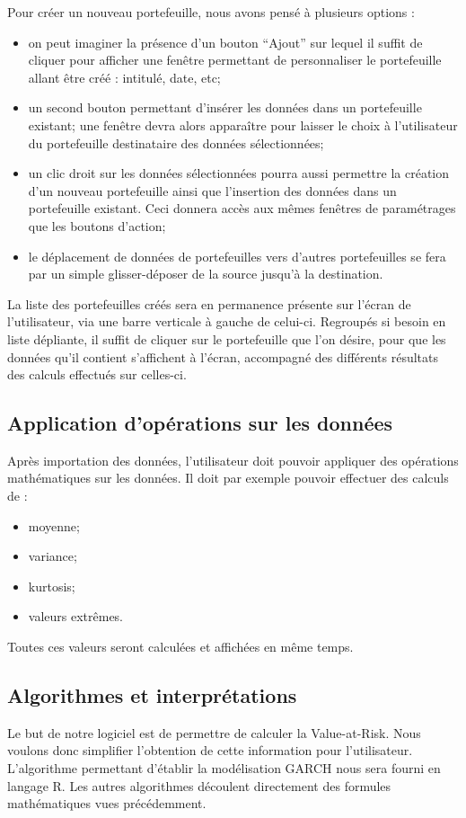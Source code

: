 		Pour créer un nouveau portefeuille, nous avons pensé à plusieurs options :
		\begin{itemize}
			\item on peut imaginer la présence d'un bouton “Ajout” sur lequel il suffit de cliquer pour afficher une fenêtre permettant de personnaliser le portefeuille allant être créé : intitulé, date, etc;
			\item un second bouton permettant d'insérer les données dans un portefeuille existant; une fenêtre devra alors apparaître pour laisser le choix à l'utilisateur du portefeuille destinataire des données sélectionnées;
			\item un clic droit sur les données sélectionnées pourra aussi permettre la création d'un nouveau portefeuille ainsi que l'insertion des données dans un portefeuille existant. Ceci donnera accès aux mêmes fenêtres de paramétrages que les boutons d'action;
			\item le déplacement de données de portefeuilles vers d'autres portefeuilles se fera par un simple glisser-déposer de la source jusqu'à la destination.
		\end{itemize}

		La liste des portefeuilles créés sera en permanence présente sur l'écran de l'utilisateur, via une barre verticale à gauche de celui-ci.
		Regroupés si besoin en liste dépliante, il suffit de cliquer sur le portefeuille que l'on désire, pour que les données qu'il contient s'affichent à l'écran, accompagné des différents résultats des calculs effectués sur celles-ci. 



	\subsection{Application d'opérations sur les données}
		Après importation des données, l'utilisateur doit pouvoir appliquer des opérations mathématiques sur les données.
		Il doit par exemple pouvoir effectuer des calculs de :
		\begin{itemize}
			\item moyenne;
			\item variance;
			\item kurtosis;
			\item valeurs extrêmes.
		\end{itemize}
		Toutes ces valeurs seront calculées et affichées en même temps.


	\subsection{Algorithmes et interprétations}
		Le but de notre logiciel est de permettre de calculer la Value-at-Risk. Nous voulons donc simplifier l'obtention de cette information pour l'utilisateur. L'algorithme permettant d'établir la modélisation GARCH nous sera fourni en langage R. Les autres algorithmes découlent directement des formules mathématiques vues précédemment.

